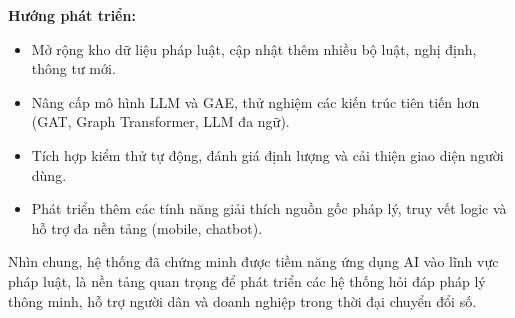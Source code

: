 \documentclass[a4paper]{article}
\begin{document}
\textbf{Hướng phát triển:}
\begin{itemize}
    \item Mở rộng kho dữ liệu pháp luật, cập nhật thêm nhiều bộ luật, nghị định, thông tư mới.
    \item Nâng cấp mô hình LLM và GAE, thử nghiệm các kiến trúc tiên tiến hơn (GAT, Graph Transformer, LLM đa ngữ).
    \item Tích hợp kiểm thử tự động, đánh giá định lượng và cải thiện giao diện người dùng.
    \item Phát triển thêm các tính năng giải thích nguồn gốc pháp lý, truy vết logic và hỗ trợ đa nền tảng (mobile, chatbot).
\end{itemize}

Nhìn chung, hệ thống đã chứng minh được tiềm năng ứng dụng AI vào lĩnh vực pháp luật, là nền tảng quan trọng để phát triển các hệ thống hỏi đáp pháp lý thông minh, hỗ trợ người dân và doanh nghiệp trong thời đại chuyển đổi số.

\newpage
\printbibliography
{}
\end{document}
